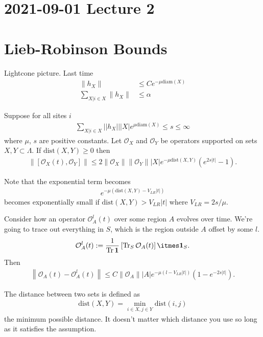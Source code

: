 \section{2021-09-01 Lecture 2}
\section{Lieb-Robinson Bounds}
Lightcone picture.
Last time
\begin{align}
    \| h_X \| &\le C e^{-\mu \mathrm{diam}(X)}\\
    \sum_{X| i\in X}\| h_X \| &\le \alpha
\end{align}
\begin{theorem}[Hastings]
    Suppose for all sites $i$
    \begin{align}
        \sum_{X | i\in X}
        || h_X ||
        |X|
        e^{\mu\mathrm{diam}(X)}
        \le s \le \infty
    \end{align}
    where $\mu$, $s$ are positive constants.
    Let $\mathcal{O}_X$ and $\mathcal{O}_Y$ be operators
    supported on sets $X,Y\subset\Lambda$.
    If $\mathrm{dist}(X, Y) \ge 0$
    then
    \begin{align}
        \|[\mathcal{O}_X(t), \mathcal{O}_Y]\|
        \le 2 \| \mathcal{O}_X \| \| \mathcal{O}_Y \| |X|
        e^{-\mu \mathrm{dist}(X, Y)}\left(
        e^{2s|t|} - 1
        \right).
    \end{align}
\end{theorem}
Note that the exponential term becomes
\begin{align}
    e^{-\mu(\mathrm{dist}(X, Y) - V_{LR}|t|)}
\end{align}
becomes exponentially small if $\mathrm{dist}(X, Y) > V_{LR}|t|$
where $V_{LR}=2s/\mu$.

Consider how an operator $\mathcal{O}_A^l(t)$ over some
region $A$ evolves over time.
We're going to trace out everything in $S$, which is the region outside $A$
offset by some $l$.
\begin{align}
    \mathcal{O}_A^l(t) := \frac{1}{\Tr \mathbf{1}}
    \left[
        \Tr_S \mathcal{O}_A(t)
        \right]\itmes \mathbf{1}_S.
\end{align}
Then
\begin{align}
    \left\|
        \mathcal{O}_A(t) - \mathcal{O}^l_A(t)
    \right\|
    \le
    C \|\mathcal{O}_A\| |A|
    e^{-\mu(l - V_{LR}|t|)}
    \left(
        1 - e^{-2s|t|}
    \right).
\end{align}

The distance between two sets is defined as
\begin{align}
    \mathrm{dist}(X, Y) = \min_{i\in X, j\in Y}
    \mathrm{dist}(i, j)
\end{align}
the minimum possible distance.
It doesn't matter which distance you use so long as it satisfies the assumption.


